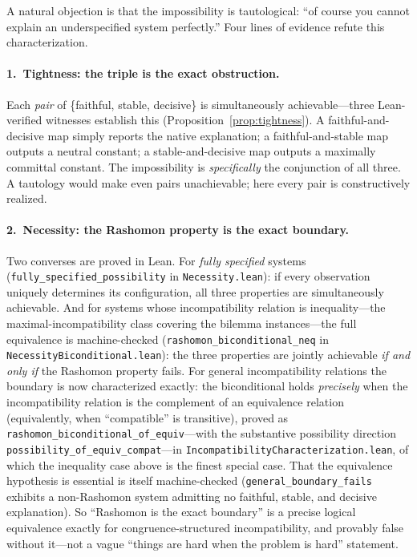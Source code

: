 \documentclass[11pt,a4paper]{article}
\begin{document}
A natural objection is that the impossibility is tautological: ``of course
you cannot explain an underspecified system perfectly.''  Four lines of
evidence refute this characterization.

\paragraph{1.\ Tightness: the triple is the exact obstruction.}
Each \emph{pair} of \{faithful, stable, decisive\} is simultaneously
achievable---three Lean-verified witnesses establish this
(Proposition~\ref{prop:tightness}).  A faithful-and-decisive map simply
reports the native explanation; a faithful-and-stable map outputs a neutral
constant; a stable-and-decisive map outputs a maximally committal constant.
The impossibility is \emph{specifically} the conjunction of all three.
A tautology would make even pairs unachievable; here every pair is
constructively realized.

\paragraph{2.\ Necessity: the Rashomon property is the exact boundary.}
Two converses are proved in Lean.  For \emph{fully specified} systems
(\texttt{fully\_specified\_possibility} in \texttt{Necessity.lean}): if every
observation uniquely determines its configuration, all three properties are
simultaneously achievable.  And for systems whose incompatibility relation is
inequality---the maximal-incompatibility class covering the bilemma
instances---the full equivalence is machine-checked
(\texttt{rashomon\_biconditional\_neq} in
\texttt{NecessityBiconditional.lean}): the three properties are jointly
achievable \emph{if and only if} the Rashomon property fails.  For general
incompatibility relations the boundary is now characterized exactly: the
biconditional holds \emph{precisely} when the incompatibility relation is the
complement of an equivalence relation (equivalently, when ``compatible'' is
transitive), proved as \texttt{rashomon\_biconditional\_of\_equiv}---with the
substantive possibility direction \texttt{possibility\_of\_equiv\_compat}---in
\texttt{IncompatibilityCharacterization.lean}, of which the inequality case
above is the finest special case.  That the equivalence hypothesis is essential
is itself machine-checked (\texttt{general\_boundary\_fails} exhibits a
non-Rashomon system admitting no faithful, stable, and decisive explanation).
So ``Rashomon is the exact boundary'' is a precise logical equivalence exactly
for congruence-structured incompatibility, and provably false without it---not
a vague ``things are hard when the problem is hard'' statement.
\end{document}
